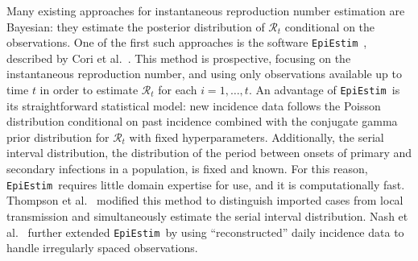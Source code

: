 \documentclass[10pt,letterpaper]{article}
\def\EpiEstim{\texttt{EpiEstim}}
\def\calR{\mathcal{R}}
\begin{document}
Many existing approaches for instantaneous reproduction number estimation are
Bayesian: they estimate the posterior distribution of $\calR_t$ conditional on
the observations. One of the first such approaches is the software \EpiEstim\
\cite{cori2020package}, described by Cori et al.~\cite{cori2013new}. This method
is prospective, focusing on the instantaneous reproduction number, and using
only observations available up to time $t$ in order to estimate $\calR_t$ for
each $i = 1,\ldots, t$. An advantage of \EpiEstim\ is its straightforward
statistical model: new incidence data follows the Poisson distribution
conditional on past incidence combined with the conjugate gamma prior
distribution for $\calR_t$ with fixed hyperparameters. Additionally, the serial
interval distribution, the distribution of the period between onsets of primary
and secondary infections in a population, is fixed and known. For this reason,
\EpiEstim\ requires little domain expertise for use, and it is computationally
fast. Thompson et al.~\cite{thompson2019improved} modified this method to
distinguish imported cases from local transmission and simultaneously estimate
the serial interval distribution. Nash et al.~\cite{nash2023estimating} further
extended \EpiEstim\ by using ``reconstructed'' daily incidence data to handle
irregularly spaced observations. 
\end{document}
